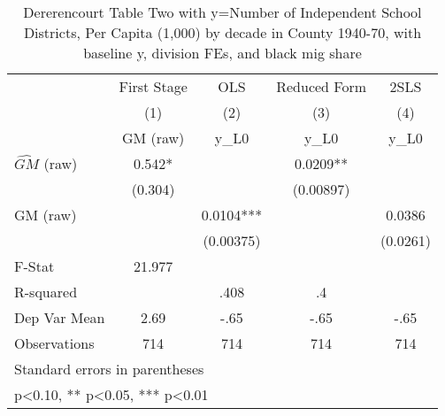 \begin{table}[htbp]\centering
\def\sym#1{\ifmmode^{#1}\else\(^{#1}\)\fi}
\caption{Dererencourt Table Two with y=Number of Independent School Districts, Per Capita (1,000) by decade in County 1940-70, with baseline y, division FEs, and black mig share}
\begin{tabular}{l*{4}{c}}
\toprule
                    & First Stage   &         OLS   &Reduced Form   &        2SLS   \\
                    &\multicolumn{1}{c}{(1)}&\multicolumn{1}{c}{(2)}&\multicolumn{1}{c}{(3)}&\multicolumn{1}{c}{(4)}\\
                    &\multicolumn{1}{c}{GM  (raw)}&\multicolumn{1}{c}{y\_L0}&\multicolumn{1}{c}{y\_L0}&\multicolumn{1}{c}{y\_L0}\\
\midrule
$\hat{GM}$ (raw)    &       0.542*  &               &      0.0209** &               \\
                    &     (0.304)   &               &   (0.00897)   &               \\
\addlinespace
GM  (raw)           &               &      0.0104***&               &      0.0386   \\
                    &               &   (0.00375)   &               &    (0.0261)   \\
\midrule
F-Stat              &      21.977   &               &               &               \\
R-squared           &               &        .408   &          .4   &               \\
Dep Var Mean        &        2.69   &        -.65   &        -.65   &        -.65   \\
Observations        &         714   &         714   &         714   &         714   \\
\bottomrule
\multicolumn{5}{l}{\footnotesize Standard errors in parentheses}\\
\multicolumn{5}{l}{\footnotesize * p<0.10, ** p<0.05, *** p<0.01}\\
\end{tabular}
\end{table}
